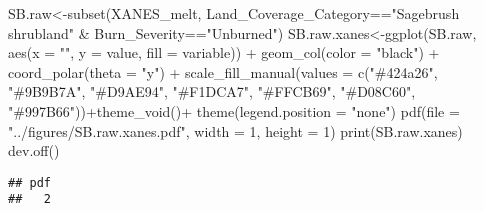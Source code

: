 \documentclass[
]{article}
\newenvironment{Shaded}{\begin{snugshade}}{\end{snugshade}}
\newcommand{\AttributeTok}[1]{\textcolor[rgb]{0.77,0.63,0.00}{#1}}
\newcommand{\DecValTok}[1]{\textcolor[rgb]{0.00,0.00,0.81}{#1}}
\newcommand{\FunctionTok}[1]{\textcolor[rgb]{0.00,0.00,0.00}{#1}}
\newcommand{\NormalTok}[1]{#1}
\newcommand{\OtherTok}[1]{\textcolor[rgb]{0.56,0.35,0.01}{#1}}
\newcommand{\SpecialCharTok}[1]{\textcolor[rgb]{0.00,0.00,0.00}{#1}}
\newcommand{\StringTok}[1]{\textcolor[rgb]{0.31,0.60,0.02}{#1}}
\begin{document}
\begin{Shaded}
\begin{Highlighting}[]
\NormalTok{SB.raw}\OtherTok{\textless{}{-}}\FunctionTok{subset}\NormalTok{(XANES\_melt, Land\_Coverage\_Category}\SpecialCharTok{==}\StringTok{"Sagebrush shrubland"} \SpecialCharTok{\&}\NormalTok{ Burn\_Severity}\SpecialCharTok{==}\StringTok{"Unburned"}\NormalTok{)}
\NormalTok{SB.raw.xanes}\OtherTok{\textless{}{-}}\FunctionTok{ggplot}\NormalTok{(SB.raw, }\FunctionTok{aes}\NormalTok{(}\AttributeTok{x =} \StringTok{""}\NormalTok{, }\AttributeTok{y =}\NormalTok{ value, }\AttributeTok{fill =}\NormalTok{ variable)) }\SpecialCharTok{+}
    \FunctionTok{geom\_col}\NormalTok{(}\AttributeTok{color =} \StringTok{"black"}\NormalTok{) }\SpecialCharTok{+}
    \FunctionTok{coord\_polar}\NormalTok{(}\AttributeTok{theta =} \StringTok{"y"}\NormalTok{) }\SpecialCharTok{+} \FunctionTok{scale\_fill\_manual}\NormalTok{(}\AttributeTok{values =} \FunctionTok{c}\NormalTok{(}\StringTok{"\#424a26"}\NormalTok{, }\StringTok{"\#9B9B7A"}\NormalTok{, }\StringTok{"\#D9AE94"}\NormalTok{, }\StringTok{"\#F1DCA7"}\NormalTok{, }\StringTok{"\#FFCB69"}\NormalTok{, }\StringTok{"\#D08C60"}\NormalTok{, }\StringTok{"\#997B66"}\NormalTok{))}\SpecialCharTok{+}\FunctionTok{theme\_void}\NormalTok{()}\SpecialCharTok{+}
    \FunctionTok{theme}\NormalTok{(}\AttributeTok{legend.position =} \StringTok{"none"}\NormalTok{)}
\FunctionTok{pdf}\NormalTok{(}\AttributeTok{file =} \StringTok{"../figures/SB.raw.xanes.pdf"}\NormalTok{, }\AttributeTok{width =} \DecValTok{1}\NormalTok{, }\AttributeTok{height =} \DecValTok{1}\NormalTok{) }
\FunctionTok{print}\NormalTok{(SB.raw.xanes)}
\FunctionTok{dev.off}\NormalTok{()}
\end{Highlighting}
\end{Shaded}

\begin{verbatim}
## pdf 
##   2
\end{verbatim}
\end{document}
